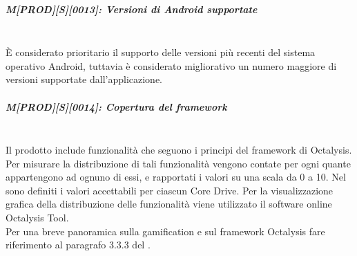 \subparagraph{M[PROD][S][0013]: Versioni di Android supportate}
~\\È considerato prioritario il supporto delle versioni più recenti del sistema operativo Android, tuttavia è considerato migliorativo un numero maggiore di versioni supportate dall'applicazione.

\subparagraph{M[PROD][S][0014]: Copertura del framework }
~\\Il prodotto include funzionalità che seguono i principi del framework di  Octalysis.
\\Per misurare la distribuzione di tali funzionalità vengono contate per ogni  quante appartengono ad ognuno di essi, e rapportati i valori su una scala da 0 a 10. Nel \PdQ{} sono definiti i valori accettabili per ciascun Core Drive. Per la visualizzazione grafica della distribuzione delle funzionalità viene utilizzato il software online Octalysis Tool.
\\Per una breve panoramica sulla gamification e sul framework Octalysis fare riferimento al paragrafo 3.3.3 del \PdQ.